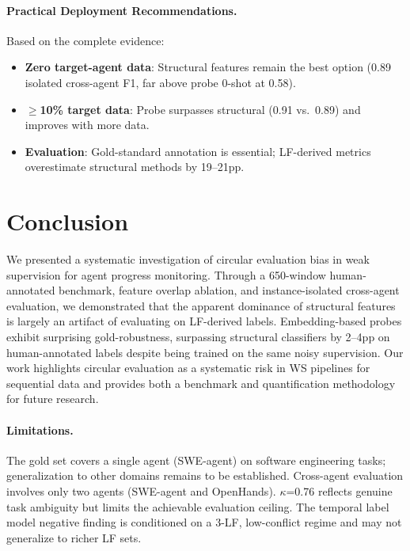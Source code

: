 \documentclass[11pt,a4paper]{article}
\begin{document}
\paragraph{Practical Deployment Recommendations.}
Based on the complete evidence:
\begin{itemize}[nosep,leftmargin=*]
\item \textbf{Zero target-agent data}: Structural features remain the best option (0.89 isolated cross-agent F1, far above probe 0-shot at 0.58).
\item \textbf{$\geq$10\% target data}: Probe surpasses structural (0.91 vs.\ 0.89) and improves with more data.
\item \textbf{Evaluation}: Gold-standard annotation is essential; LF-derived metrics overestimate structural methods by 19--21pp.
\end{itemize}

\section{Conclusion}
\label{sec:conclusion}

We presented a systematic investigation of circular evaluation bias in weak supervision for agent progress monitoring.
Through a 650-window human-annotated benchmark, feature overlap ablation, and instance-isolated cross-agent evaluation, we demonstrated that the apparent dominance of structural features is largely an artifact of evaluating on LF-derived labels.
Embedding-based probes exhibit surprising gold-robustness, surpassing structural classifiers by 2--4pp on human-annotated labels despite being trained on the same noisy supervision.
Our work highlights circular evaluation as a systematic risk in WS pipelines for sequential data and provides both a benchmark and quantification methodology for future research.

\paragraph{Limitations.}
The gold set covers a single agent (SWE-agent) on software engineering tasks; generalization to other domains remains to be established.
Cross-agent evaluation involves only two agents (SWE-agent and OpenHands).
$\kappa$=0.76 reflects genuine task ambiguity but limits the achievable evaluation ceiling.
The temporal label model negative finding is conditioned on a 3-LF, low-conflict regime and may not generalize to richer LF sets.


\end{document}
